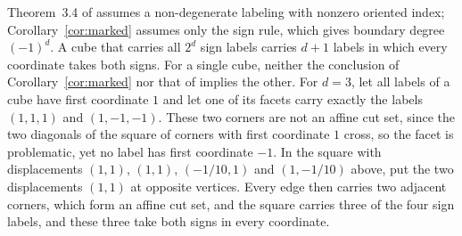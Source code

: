 \documentclass[11pt]{amsart}
\theoremstyle{definition}
\theoremstyle{remark}
\numberwithin{equation}{section}
\begin{document}
Theorem~3.4 of \cite{GS1} assumes a non-degenerate labeling with nonzero oriented index; Corollary~\ref{cor:marked} assumes only the sign rule, which gives boundary degree $(-1)^d$. A cube that carries all $2^d$ sign labels carries $d+1$ labels in which every coordinate takes both signs. For a single cube, neither the conclusion of Corollary~\ref{cor:marked} nor that of \cite[Theorem~3.4]{GS1} implies the other. For $d=3$, let all labels of a cube have first coordinate $1$ and let one of its facets carry exactly the labels $(1,1,1)$ and $(1,-1,-1)$. These two corners are not an affine cut set, since the two diagonals of the square of corners with first coordinate $1$ cross, so the facet is problematic, yet no label has first coordinate $-1$. In the square with displacements $(1,1)$, $(1,1)$, $(-1/10,1)$ and $(1,-1/10)$ above, put the two displacements $(1,1)$ at opposite vertices. Every edge then carries two adjacent corners, which form an affine cut set, and the square carries three of the four sign labels, and these three take both signs in every coordinate.
\end{document}
